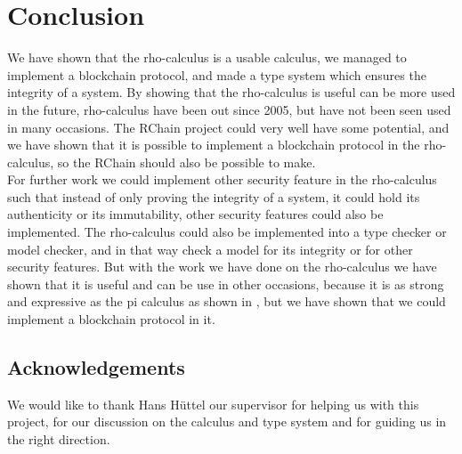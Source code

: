 \section{Conclusion}
We have shown that the rho-calculus is a usable calculus, we managed to implement a blockchain protocol, and made a type system which ensures the integrity of a system. By showing that the rho-calculus is useful can be more used in the future, rho-calculus have been out since 2005, but have not been seen used in many occasions. The RChain project could very well have some potential, and we have shown that it is possible to implement a blockchain protocol in the rho-calculus, so the RChain should also be possible to make.\\

For further work we could implement other security feature in the rho-calculus such that instead of only proving the integrity of a system, it could hold its authenticity or its immutability, other security features could also be implemented. The rho-calculus could also be implemented into a type checker or model checker, and in that way check a model for its integrity or for other security features. But with the work we have done on the rho-calculus we have shown that it is useful and can be use in other occasions, because it is as strong and expressive as the pi calculus as shown in \citep{Meredith2005}, but we have shown that we could implement a blockchain protocol in it.


\subsection*{Acknowledgements}
We would like to thank Hans Hüttel our supervisor for helping us with this project, for our discussion on the calculus and type system and for guiding us in the right direction.
